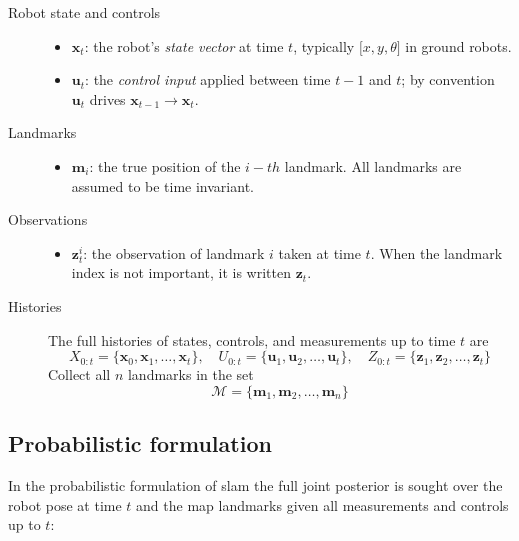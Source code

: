 \begin{description}
  \item[Robot state and controls]
        \begin{itemize}
          \item \(\mathbf{x}_t\): the robot's \emph{state vector} at time \(t\), typically \(\bigl[x,y,\theta]\) in ground robots.
          \item \(\mathbf{u}_t\): the \emph{control input} applied between time \(t-1\) and \(t\); by convention \(\mathbf{u}_t\) drives \(\mathbf{x}_{t-1}\to\mathbf{x}_t\).
        \end{itemize}

  \item[Landmarks]
        \begin{itemize}
          \item \(\mathbf{m}_i\): the true position of the \(i-th\) landmark. All landmarks are assumed to be time invariant.
        \end{itemize}

  \item[Observations]
        \begin{itemize}
          \item \(\mathbf{z}_t^i\): the observation of landmark \(i\) taken at time \(t\). When the landmark index is not important, it is written \(\mathbf{z}_t\).
        \end{itemize}

  \item[Histories]
        The full histories of states, controls, and measurements up to time \(t\) are
        \[
          X_{0:t} = \{\mathbf{x}_0,\mathbf{x}_1,\ldots,\mathbf{x}_t\},
          \quad
          U_{0:t} = \{\mathbf{u}_1,\mathbf{u}_2,\ldots,\mathbf{u}_t\},
          \quad
          Z_{0:t} = \{\mathbf{z}_1,\mathbf{z}_2,\ldots,\mathbf{z}_t\}
        \]
        Collect all \(n\) landmarks in the set
        \[
          \mathcal{M} = \{\mathbf{m}_1,\mathbf{m}_2,\dots,\mathbf{m}_n\}
        \]

\end{description}

\subsection{Probabilistic formulation}\label{Probabilisticslam}

In the probabilistic formulation of \gls{slam} the full joint posterior is sought over the robot pose at time $t$ and the map landmarks given all measurements and controls up to $t$:

